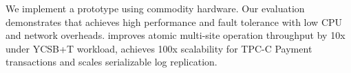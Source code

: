 




We implement a \sys prototype using commodity hardware. Our evaluation demonstrates that \sys achieves high performance and fault tolerance with low CPU and network overheads. \sys improves atomic multi-site operation throughput by 10x under YCSB+T workload, achieves 100x scalability for TPC-C Payment transactions and scales serializable log replication.

